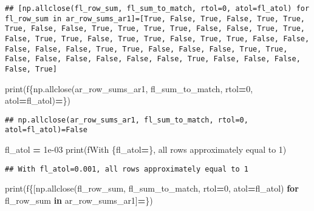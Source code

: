 \documentclass[
]{book}
\newenvironment{Shaded}{\begin{snugshade}}{\end{snugshade}}
\newcommand{\BuiltInTok}[1]{#1}
\newcommand{\ControlFlowTok}[1]{\textcolor[rgb]{0.13,0.29,0.53}{\textbf{#1}}}
\newcommand{\DecValTok}[1]{\textcolor[rgb]{0.00,0.00,0.81}{#1}}
\newcommand{\FloatTok}[1]{\textcolor[rgb]{0.00,0.00,0.81}{#1}}
\newcommand{\KeywordTok}[1]{\textcolor[rgb]{0.13,0.29,0.53}{\textbf{#1}}}
\newcommand{\NormalTok}[1]{#1}
\newcommand{\OperatorTok}[1]{\textcolor[rgb]{0.81,0.36,0.00}{\textbf{#1}}}
\newcommand{\SpecialCharTok}[1]{\textcolor[rgb]{0.00,0.00,0.00}{#1}}
\newcommand{\SpecialStringTok}[1]{\textcolor[rgb]{0.31,0.60,0.02}{#1}}
\begin{document}
\begin{verbatim}
## [np.allclose(fl_row_sum, fl_sum_to_match, rtol=0, atol=fl_atol) for fl_row_sum in ar_row_sums_ar1]=[True, False, True, False, True, True, True, False, False, True, True, True, True, False, False, True, True, False, True, True, False, True, True, False, True, True, False, False, False, False, False, True, True, False, False, False, True, True, False, False, False, False, False, False, True, False, False, False, False, True]
\end{verbatim}

\begin{Shaded}
\begin{Highlighting}[]
\BuiltInTok{print}\NormalTok{(}\SpecialStringTok{f\textquotesingle{}}\SpecialCharTok{\{np.}\NormalTok{allclose(ar\_row\_sums\_ar1, fl\_sum\_to\_match, rtol}\OperatorTok{=}\DecValTok{0}\NormalTok{, atol}\OperatorTok{=}\NormalTok{fl\_atol)}\OperatorTok{=}\SpecialCharTok{\}}\SpecialStringTok{\textquotesingle{}}\NormalTok{)}
\end{Highlighting}
\end{Shaded}

\begin{verbatim}
## np.allclose(ar_row_sums_ar1, fl_sum_to_match, rtol=0, atol=fl_atol)=False
\end{verbatim}

\begin{Shaded}
\begin{Highlighting}[]
\NormalTok{fl\_atol }\OperatorTok{=} \FloatTok{1e{-}03}
\BuiltInTok{print}\NormalTok{(}\SpecialStringTok{f\textquotesingle{}With }\SpecialCharTok{\{}\NormalTok{fl\_atol}\OperatorTok{=}\SpecialCharTok{\}}\SpecialStringTok{, all rows approximately equal to 1\textquotesingle{}}\NormalTok{)}
\end{Highlighting}
\end{Shaded}

\begin{verbatim}
## With fl_atol=0.001, all rows approximately equal to 1
\end{verbatim}

\begin{Shaded}
\begin{Highlighting}[]
\BuiltInTok{print}\NormalTok{(}\SpecialStringTok{f\textquotesingle{}}\SpecialCharTok{\{}\NormalTok{[np.allclose(fl\_row\_sum, fl\_sum\_to\_match, rtol}\OperatorTok{=}\DecValTok{0}\NormalTok{, atol}\OperatorTok{=}\NormalTok{fl\_atol) }\ControlFlowTok{for}\NormalTok{ fl\_row\_sum }\KeywordTok{in}\NormalTok{ ar\_row\_sums\_ar1]}\OperatorTok{=}\SpecialCharTok{\}}\SpecialStringTok{\textquotesingle{}}\NormalTok{)}
\end{Highlighting}
\end{Shaded}
\end{document}
